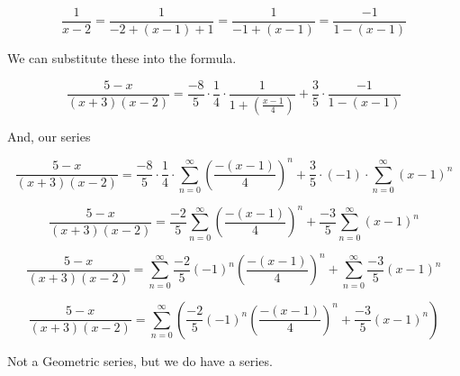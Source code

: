\documentclass{ximera}
\begin{document}
\[    \frac{1}{x-2} =  \frac{1}{-2 + (x-1)+1}    =  \frac{1}{-1 + (x-1)}   =  \frac{-1}{1 - (x-1)}  \]



We can substitute these into the formula.






\[ \frac{5-x}{(x+3)(x-2)}     =  \frac{-8}{5} \cdot \frac{1}{4} \cdot \frac{1}{1+\left( \frac{x-1}{4} \right) } + \frac{3}{5} \cdot \frac{-1}{1 - (x-1)}      \]



And, our series



\[ \frac{5-x}{(x+3)(x-2)}     =  \frac{-8}{5} \cdot \frac{1}{4} \cdot     \sum_{n=0}^{\infty} \left( \frac{-(x-1)}{4} \right)^n                 + \frac{3}{5} \cdot (-1) \cdot \sum_{n=0}^{\infty} (x-1)^n     \]






\[ \frac{5-x}{(x+3)(x-2)}     =  \frac{-2}{5}     \sum_{n=0}^{\infty} \left( \frac{-(x-1)}{4} \right)^n                 + \frac{-3}{5} \sum_{n=0}^{\infty} (x-1)^n     \]












\[ \frac{5-x}{(x+3)(x-2)}     =      \sum_{n=0}^{\infty} \frac{-2}{5}  (-1)^n \left( \frac{-(x-1)}{4} \right)^n                 +  \sum_{n=0}^{\infty} \frac{-3}{5} (x-1)^n     \]







\[ \frac{5-x}{(x+3)(x-2)}     =      \sum_{n=0}^{\infty} \left( \frac{-2}{5}  (-1)^n \left( \frac{-(x-1)}{4} \right)^n                 +  \frac{-3}{5} (x-1)^n  \right)   \]










Not a Geometric series, but we do have a series.
\end{document}
